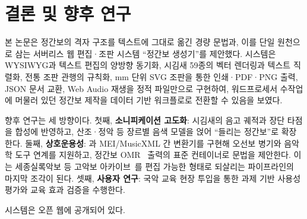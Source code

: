 \section{결론 및 향후 연구}
\label{sec:conclusion}

본 논문은 정간보의 격자 구조를 텍스트에 그대로 옮긴 경량 문법과, 이를
단일 원천으로 삼는 서버리스 웹 편집·조판 시스템 ``정간보 생성기''를
제안했다. 시스템은 WYSIWYG과 텍스트 편집의 양방향 동기화, 시김새 59종의
벡터 렌더링과 텍스트 직렬화, 전통 조판 관행의 규칙화, mm 단위 SVG 조판을
통한 인쇄·PDF·PNG 출력, JSON 문서 교환, Web Audio 재생을 정적 파일만으로
구현하여, 워드프로세서 수작업에 머물러 있던 정간보 제작을 데이터 기반
워크플로로 전환할 수 있음을 보였다.

향후 연구는 세 방향이다.
첫째, \textbf{소니피케이션 고도화}: 시김새의 음고 궤적과 장단 타점을
합성에 반영하고, 산조·정악 등 장르별 음색 모델을 얹어 ``들리는 정간보''로
확장한다.
둘째, \textbf{상호운용성}: 과 MEI/MusicXML 간 변환기를
구현해 오선보 병기와 음악학 도구 연계를 지원하고, 정간보
OMR~\cite{kim2025omr} 출력의 표준 컨테이너로 문법을 제안한다.
이는 세종실록악보 등 고악보 아카이브~\cite{han2024sixdragons}를
편집 가능한 형태로 되살리는 파이프라인의 마지막 조각이 된다.
셋째, \textbf{사용자 연구}: 국악 교육 현장 투입을 통한 과제 기반 사용성
평가와 교육 효과 검증을 수행한다.

시스템은 오픈 웹에 공개되어 있다.

